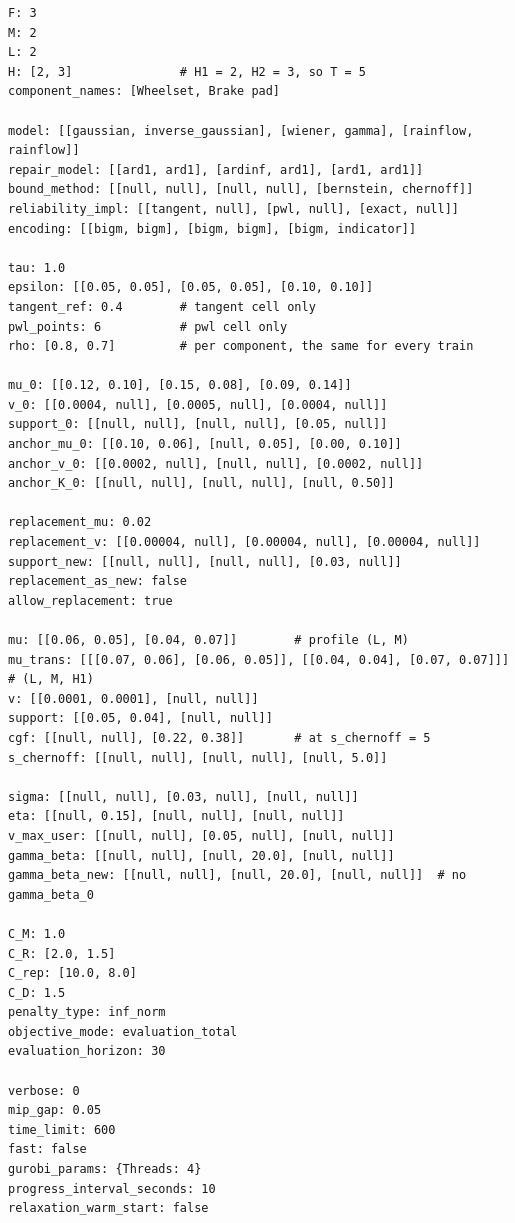 \documentclass[11pt,a4paper]{article}
\theoremstyle{plain}
\theoremstyle{definition}
\renewcommand{\_}{\textunderscore\allowbreak{}}
\begin{document}
\begin{lstlisting}
F: 3
M: 2
L: 2
H: [2, 3]               # H1 = 2, H2 = 3, so T = 5
component_names: [Wheelset, Brake pad]

model: [[gaussian, inverse_gaussian], [wiener, gamma], [rainflow, rainflow]]
repair_model: [[ard1, ard1], [ardinf, ard1], [ard1, ard1]]
bound_method: [[null, null], [null, null], [bernstein, chernoff]]
reliability_impl: [[tangent, null], [pwl, null], [exact, null]]
encoding: [[bigm, bigm], [bigm, bigm], [bigm, indicator]]

tau: 1.0
epsilon: [[0.05, 0.05], [0.05, 0.05], [0.10, 0.10]]
tangent_ref: 0.4        # tangent cell only
pwl_points: 6           # pwl cell only
rho: [0.8, 0.7]         # per component, the same for every train

mu_0: [[0.12, 0.10], [0.15, 0.08], [0.09, 0.14]]
v_0: [[0.0004, null], [0.0005, null], [0.0004, null]]
support_0: [[null, null], [null, null], [0.05, null]]
anchor_mu_0: [[0.10, 0.06], [null, 0.05], [0.00, 0.10]]
anchor_v_0: [[0.0002, null], [null, null], [0.0002, null]]
anchor_K_0: [[null, null], [null, null], [null, 0.50]]

replacement_mu: 0.02
replacement_v: [[0.00004, null], [0.00004, null], [0.00004, null]]
support_new: [[null, null], [null, null], [0.03, null]]
replacement_as_new: false
allow_replacement: true

mu: [[0.06, 0.05], [0.04, 0.07]]        # profile (L, M)
mu_trans: [[[0.07, 0.06], [0.06, 0.05]], [[0.04, 0.04], [0.07, 0.07]]]  # (L, M, H1)
v: [[0.0001, 0.0001], [null, null]]
support: [[0.05, 0.04], [null, null]]
cgf: [[null, null], [0.22, 0.38]]       # at s_chernoff = 5
s_chernoff: [[null, null], [null, null], [null, 5.0]]

sigma: [[null, null], [0.03, null], [null, null]]
eta: [[null, 0.15], [null, null], [null, null]]
v_max_user: [[null, null], [0.05, null], [null, null]]
gamma_beta: [[null, null], [null, 20.0], [null, null]]
gamma_beta_new: [[null, null], [null, 20.0], [null, null]]  # no gamma_beta_0

C_M: 1.0
C_R: [2.0, 1.5]
C_rep: [10.0, 8.0]
C_D: 1.5
penalty_type: inf_norm
objective_mode: evaluation_total
evaluation_horizon: 30

verbose: 0
mip_gap: 0.05
time_limit: 600
fast: false
gurobi_params: {Threads: 4}
progress_interval_seconds: 10
relaxation_warm_start: false
\end{lstlisting}
\end{document}
